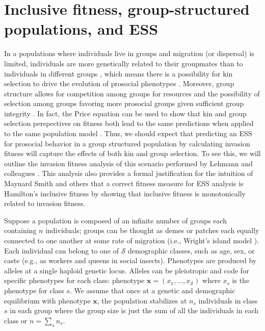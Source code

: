 \documentclass[11pt]{article}
\renewcommand{\vec}[1]{\symbf{#1}}
\newcommand{\numc}{\mathcal{S}}
\begin{document}
\section{Inclusive fitness, group-structured populations, and ESS}

In a populations where individuals live in groups and migration (or dispersal) is limited, individuals are more genetically related to their groupmates than to individuals in different groups \cite{Wright:1943,Wright:1951,Hamilton:1970}, which means there is a possibility for kin selection to drive the evolution of prosocial phenotypes \cite{Hamilton:1964,Rousset:2004,Lehmann:Rousset:2014}. Moreover, group structure allows for competition among groups for resources and the possibility of selection among groups favoring more prosocial groups given sufficient group integrity \cite{Hamilton:1975,Wilson:Pollock:1992,Traulsen:Nowak:2006,Gardner:West:2006,Lehmann:Rousset:2010}. In fact, the Price equation \cite{Price:1970,Price:1972:cov} can be used to show that kin and group selection perspectives on fitness both lead to the same predictions when applied to the same population model \cite{Queller:1992,Lehmann:Keller:2007,Bijma:Wade:2008,Gardner:West:2007,Marshall:2011,Akcay:VanCleve:2012}. Thus, we should expect that predicting an ESS for prosocial behavior in a group structured population by calculating invasion fitness will capture the effects of both kin and group selection. To see this, we will outline the invasion fitness analysis of this scenario performed by Lehmann and colleagues \cite{Lehmann:Mullon:2016,Lehmann:Rousset:2020}. This analysis also provides a formal justification for the intuition of Maynard Smith \cite{MaynardSmith:1978} and others that a correct fitness measure for ESS analysis is Hamilton's inclusive fitness \cite{Hamilton:1964} by showing that inclusive fitness is monotonically related to invasion fitness.

Suppose a population is composed of an infinite number of groups each containing $n$ individuals; groups can be thought as demes or patches each  equally connected to one another at some rate of migration (i.e., Wright's island model \cite{Wright:1931}). Each individual can belong to one of $\numc$ demographic classes, such as age, sex, or caste (e.g., as workers and queens in social insects). Phenotypes are produced by alleles at a single haploid genetic locus. Alleles can be pleiotropic and code for specific phenotypes for each class: phenotype $\vec{x}=(x_{1},\ldots,x_{\numc})$ where $x_{s}$ is the phenotype for class $s$. We assume that once at a genetic and demographic equilibrium with phenotype $\vec{x}$, the population stabilizes at $n_{s}$ individuals in class $s$ in each group where the group size is just the sum of all the individuals in each class or $n = \sum_{s} n_{s}$.
\end{document}
